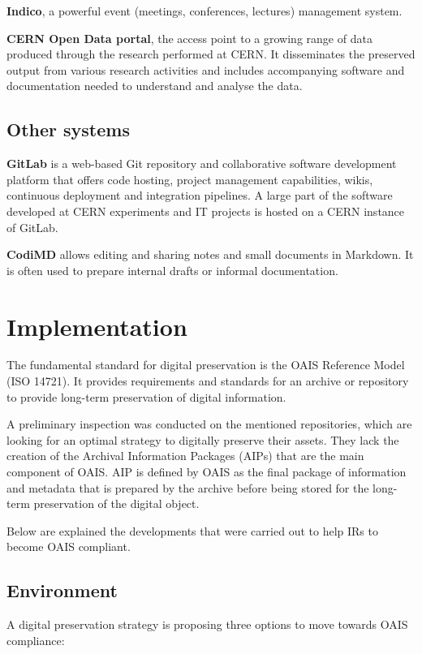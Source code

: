 \documentclass[11pt]{IEEEtran}
\begin{document}
\textbf{Indico}, a powerful event (meetings, conferences, lectures) management system.

\textbf{CERN Open Data portal}, the access point to a growing range of data produced through the research performed at CERN. It disseminates the preserved output from various research activities and includes accompanying software and documentation needed to understand and analyse the data.

\subsection{Other systems}


\textbf{GitLab} is a web-based Git repository and collaborative software development platform that offers code hosting, project management capabilities, wikis, continuous deployment and integration pipelines. A large part of the software developed at CERN experiments and IT projects is hosted on a CERN instance of GitLab.

\textbf{CodiMD} allows editing and sharing notes and small documents in Markdown. It is often used to prepare internal drafts or informal documentation.


\section{Implementation}

The fundamental standard for digital preservation is the OAIS Reference Model\cite{OAIS2002} (ISO 14721). It provides requirements and standards for an archive or repository to provide long-term preservation of digital information.

A preliminary inspection was conducted on the mentioned repositories, which are looking for an optimal strategy to digitally preserve their assets. They lack the creation of the Archival Information Packages (AIPs) that are the main component of OAIS. AIP is defined by OAIS as the final package of information and metadata that is prepared by the archive before being stored for the long-term preservation of the digital object.

Below are explained the developments that were carried out to help IRs to become OAIS compliant.

\subsection{Environment}

A digital preservation strategy\cite{strategy} is proposing three options to move towards OAIS compliance:
\end{document}
